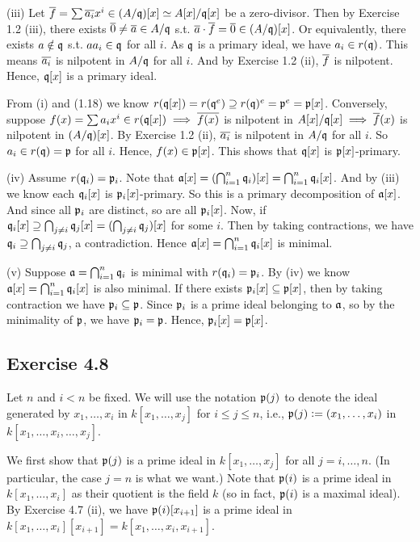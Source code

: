 \documentclass[../A&M.tex]{subfiles}
\begin{document}
(iii) Let $\overline{f}=\sum \overline{a_i}x^i \in (A/\mathfrak{q})[x] \simeq A[x]/\mathfrak{q}[x]$ be a zero-divisor. Then by Exercise 1.2 (iii), there exists $\overline{0} \neq \overline{a} \in A/\mathfrak{q}$ s.t. $\overline{a}\cdot\overline{f} = \overline{0} \in (A/\mathfrak{q})[x]$. Or equivalently, there exists $a \notin \mathfrak{q}$ s.t. $aa_i \in \mathfrak{q}$ for all $i$. As $\mathfrak{q}$ is a primary ideal, we have $a_i \in r(\mathfrak{q})$. This means $\overline{a_i}$ is nilpotent in $A/\mathfrak{q}$ for all $i$. And by Exercise 1.2 (ii), $\overline{f}$ is nilpotent. Hence, $\mathfrak{q}[x]$ is a primary ideal.

From (i) and (1.18) we know $r(\mathfrak{q}[x]) = r(\mathfrak{q}^e) \supseteq r(\mathfrak{q})^e = \mathfrak{p}^e = \mathfrak{p}[x]$. Conversely, suppose $f(x) = \sum a_ix^i \in r(\mathfrak{q}[x]) \implies \overline{f(x)}$ is nilpotent in $A[x]/\mathfrak{q}[x] \implies \overline{f}(x)$ is nilpotent in $(A/\mathfrak{q})[x]$. By Exercise 1.2 (ii), $\overline{a_i}$ is nilpotent in $A/\mathfrak{q}$ for all $i$. So $a_i \in r(\mathfrak{q}) = \mathfrak{p}$ for all $i$. Hence, $f(x) \in \mathfrak{p}[x]$. This shows that $\mathfrak{q}[x]$ is $\mathfrak{p}[x]$-primary.

(iv) Assume $r(\mathfrak{q}_i) = \mathfrak{p}_i$. Note that $\mathfrak{a}[x] = (\bigcap_{i=1}^n \mathfrak{q}_i)[x] = \bigcap_{i=1}^n \mathfrak{q}_i[x]$. And by (iii) we know each $\mathfrak{q}_i[x]$ is $\mathfrak{p}_i[x]$-primary. So this is a primary decomposition of $\mathfrak{a}[x]$. And since all $\mathfrak{p}_i$ are distinct, so are all $\mathfrak{p}_i[x]$. Now, if $\mathfrak{q}_i[x] \supseteq \bigcap_{j\neq i} \mathfrak{q}_j[x] = (\bigcap_{j\neq i} \mathfrak{q}_j) [x]$ for some $i$. Then by taking contractions, we have $\mathfrak{q}_i \supseteq \bigcap_{j\neq i} \mathfrak{q}_j$, a contradiction. Hence $\mathfrak{a}[x] = \bigcap_{i=1}^n \mathfrak{q}_i[x]$ is minimal.

(v) Suppose $\mathfrak{a} = \bigcap_{i=1}^n \mathfrak{q}_i$ is minimal with $r(\mathfrak{q}_i) = \mathfrak{p}_i$. By (iv) we know $\mathfrak{a}[x] = \bigcap_{i=1}^n \mathfrak{q}_i[x]$ is also minimal. If there exists $\mathfrak{p}_i[x] \subseteq \mathfrak{p}[x]$, then by taking contraction we have $\mathfrak{p}_i \subseteq \mathfrak{p}$. Since $\mathfrak{p}_i$ is a prime ideal belonging to $\mathfrak{a}$, so by the minimality of $\mathfrak{p}$, we have $\mathfrak{p}_i = \mathfrak{p}$. Hence, $\mathfrak{p}_i[x] = \mathfrak{p}[x]$.

\subsection*{Exercise 4.8}

Let $n$ and $i<n$ be fixed. We will use the notation $\mathfrak{p}(j)$ to denote the ideal generated by $x_1,\ldots,x_i$ in $k[x_1,\ldots,x_j]$ for $i \leq j \leq n$, i.e., $\mathfrak{p}(j) := (x_1,\ldots,x_i)$ in $k[x_1,\ldots,x_i,\ldots,x_j]$.

We first show that $\mathfrak{p}(j)$ is a prime ideal in $k[x_1,\ldots,x_j]$ for all $j=i,\ldots,n$. (In particular, the case $j=n$ is what we want.) Note that $\mathfrak{p}(i)$ is a prime ideal in $k[x_1,\ldots,x_i]$ as their quotient is the field $k$ (so in fact, $\mathfrak{p}(i)$ is a maximal ideal). By Exercise 4.7 (ii), we have $\mathfrak{p}(i) [x_{i+1}]$ is a prime ideal in $k[x_1,\ldots,x_i][x_{i+1}] = k[x_1,\ldots,x_i,x_{i+1}]$.
\end{document}
